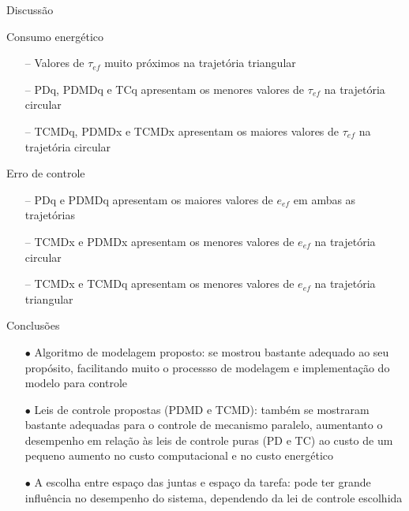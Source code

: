 \documentclass[25pt,landscape]{beamer}
\begin{document}
\begin{frame}{Discussão}
    \begin{block}{Consumo energético}
        \begin{itemize}
            \item[--] Valores de $\tau_{ef}$ muito próximos na trajetória triangular \\[4pt]
            \item[--] PDq, PDMDq e TCq apresentam os menores valores de $\tau_{ef}$ na trajetória circular \\[4pt]
            \item[--] TCMDq, PDMDx e TCMDx apresentam os maiores valores de $\tau_{ef}$ na trajetória circular \\[4pt]
        \end{itemize}
    \end{block}
    \pause
    \begin{block}{Erro de controle}
        \begin{itemize}
            \item[--] PDq e PDMDq apresentam os maiores valores de $e_{ef}$ em ambas as trajetórias \\[4pt]
            \item[--] TCMDx e PDMDx apresentam os menores valores de $e_{ef}$ na trajetória circular \\[4pt]
            \item[--] TCMDx e TCMDq apresentam os menores valores de $e_{ef}$ na trajetória triangular \\[4pt]
        \end{itemize}
    \end{block}
\end{frame}

\begin{frame}{Conclusões}
    \begin{block}{}
    	\pause
        \begin{itemize}
            \item[$\bullet$] Algoritmo de modelagem proposto: se mostrou bastante adequado ao seu propósito, facilitando muito o processso de modelagem e implementação do modelo para controle \\[8pt]
            \pause
            \item[$\bullet$] Leis de controle propostas (PDMD e TCMD): também se mostraram bastante adequadas para o controle de mecanismo paralelo, aumentanto o desempenho em relação às leis de controle puras (PD e TC) ao custo de um pequeno aumento no custo computacional e no custo energético \\[8pt]
            \pause
            \item[$\bullet$] A escolha entre espaço das juntas e espaço da tarefa: pode ter grande influência no desempenho do sistema, dependendo da lei de controle escolhida \\[8pt]
        \end{itemize}
    \end{block}
\end{frame}
\end{document}
